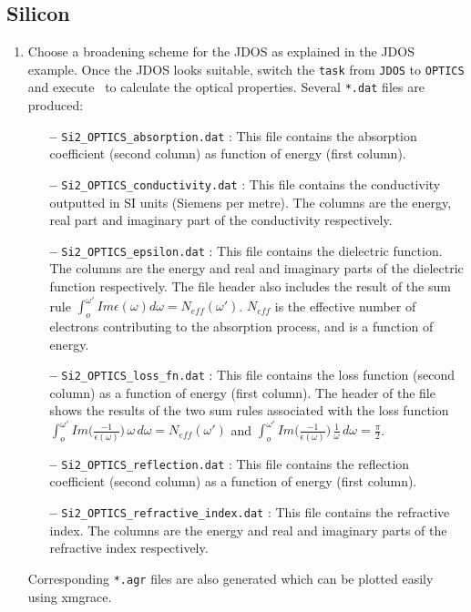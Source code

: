 \documentclass[a4paper,11pt,twoside]{book}
\begin{document}
{\subsection{Silicon}
\begin{enumerate}
\item Choose a broadening scheme for the JDOS as explained in the JDOS example.  Once the JDOS looks suitable, switch the \verb#task# from \verb#JDOS# to \verb#OPTICS# and execute \optados\ to calculate the optical properties.  Several \verb#*.dat# files are produced:
\begin{itemize}
\item[{\bf --}] \verb#Si2_OPTICS_absorption.dat# : This file contains the absorption coefficient (second column) as function of energy (first column).
\item[{\bf --}] \verb#Si2_OPTICS_conductivity.dat# : This file contains the conductivity outputted in SI units (Siemens per metre).  The columns are the energy, real part  and imaginary part of the conductivity respectively.  
\item[{\bf --}] \verb#Si2_OPTICS_epsilon.dat# : This file contains the dielectric function.  The columns are the energy and real and imaginary parts of the dielectric function respectively. The file header also includes the result of the sum rule $\int_o^{\omega'}Im\epsilon{}(\omega{})d\omega = N_{eff}(\omega')$.  $N_{eff}$ is the effective number of electrons contributing to the absorption process, and is a function of energy.    
\item[{\bf --}] \verb#Si2_OPTICS_loss_fn.dat# : This file contains the loss function (second column) as a function of energy (first column).  The header of the file shows the results of the two sum rules associated with the loss function $\int_o^{\omega'}Im\Big(\frac{-1}{\epsilon{}(\omega{})}\Big)\,\omega{}\,d\omega = N_{eff}(\omega')$ and $\int_o^{\omega'}Im\Big(\frac{-1}{\epsilon{}(\omega{})}\Big)\,\frac{1}{\omega}\,d\omega = \frac{\pi}{2}$.
\item[{\bf --}] \verb#Si2_OPTICS_reflection.dat# : This file contains the reflection coefficient (second column) as a function of energy (first column).
\item[{\bf --}] \verb#Si2_OPTICS_refractive_index.dat# : This file contains the refractive index.  The columns are the energy and real and imaginary parts of the refractive index respectively.  
\end{itemize}
Corresponding \verb#*.agr# files are also generated which can be plotted easily using xmgrace.


\end{enumerate}}
\end{document}
